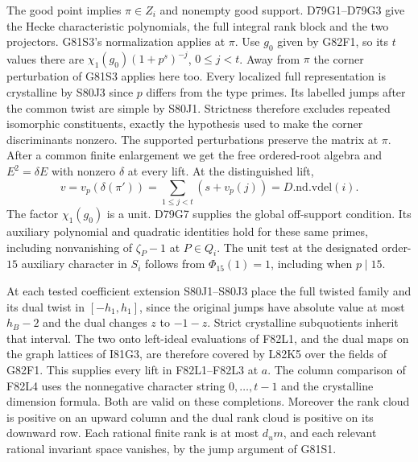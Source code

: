 The good point implies $\pi\in Z_i$ and nonempty good support.
D79G1--D79G3 give the Hecke characteristic polynomials, the
full integral rank block and the two projectors. G81S3's
normalization applies at $\pi$. Use $g_0$ given by G82F1, so its
$t$ values there are $\chi_1(g_0)(1+p^s)^{-j}$, $0\le j<t$.
Away from $\pi$ the corner perturbation of G81S3 applies here
too. Every localized full representation is crystalline by S80J3
since $p$ differs from the type primes. Its labelled jumps after
the common twist are simple by S80J1. Strictness therefore excludes
repeated isomorphic constituents, exactly the hypothesis used to
make the corner discriminants nonzero. The supported perturbations
preserve the matrix at $\pi$. After a common finite enlargement
we get the free ordered-root algebra and $E^2=\delta E$ with
nonzero $\delta$ at every lift. At the distinguished lift,
\[
            v=v_p(\delta(\pi'))=\sum_{1\le j<t}(s+v_p(j))
                                 =D.\mathrm{nd.vdel}(i).
\]
The factor $\chi_1(g_0)$ is a unit. D79G7 supplies the global
off-support condition. Its auxiliary polynomial and quadratic
identities hold for these same primes, including nonvanishing
of $\zeta_P-1$ at $P\in Q_i$. The unit test at the designated
order-$15$ auxiliary character in $S_i$ follows from
$\Phi_{15}(1)=1$, including when $p\mid15$.

At each tested coefficient extension S80J1--S80J3 place the full
twisted family and its dual twist in $[-h_1,h_1]$, since the
original jumps have absolute value at most $h_B-2$ and the dual
changes $z$ to $-1-z$. Strict crystalline subquotients inherit
that interval. The two onto left-ideal evaluations of F82L1,
and the dual maps on the graph lattices of I81G3, are therefore
covered by L82K5 over the fields of G82F1. This supplies every
lift in F82L1--F82L3 at $a$. The column comparison of F82L4
uses the nonnegative character string $0,\dots,t-1$ and the
crystalline dimension formula. Both are valid on these completions.
Moreover the rank cloud is positive on an upward column and the
dual rank cloud is positive on its downward row. Each rational
finite rank is at most $d_u m$, and each relevant rational
invariant space vanishes, by the jump argument of G81S1.


